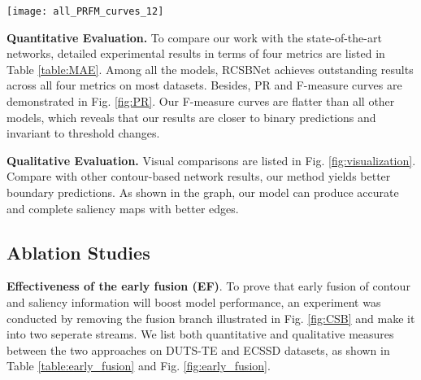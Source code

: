 \documentclass[10pt,twocolumn,letterpaper]{article}
\begin{document}
\begin{figure*}[!h]
\centering
     \texttt{[image: all\_PRFM\_curves\_12]}
     \caption{First row: Precision-Recall Curves comparison on five saliency benchmark datasets. Second row: F-measure Curves comparison on five saliency benchmark datasets. }
     \label{fig:PR}
\end{figure*}

\textbf{Quantitative Evaluation.}
To compare our work with the state-of-the-art networks, detailed experimental results in terms of four metrics are listed in Table \ref{table:MAE}. Among all the models, RCSBNet achieves outstanding results across all four metrics on most datasets. Besides, PR and F-measure curves are demonstrated in Fig. \ref{fig:PR}. Our F-measure curves are flatter than all other models, which reveals that our results are closer to binary predictions and invariant to threshold changes.

\textbf{Qualitative Evaluation.}
Visual comparisons are listed in Fig. \ref{fig:visualization}. Compare with other contour-based network results, our method yields better boundary predictions. As shown in the graph, our model can produce accurate and complete saliency maps with better edges.



\subsection{Ablation Studies}\label{ablation}
\textbf{Effectiveness of the early fusion (EF)}. To prove that early fusion of contour and saliency information will boost model performance, an experiment was conducted by removing the fusion branch illustrated in Fig. \ref{fig:CSB} and make it into two seperate streams. We list both quantitative and qualitative measures between the two approaches on DUTS-TE and ECSSD datasets, as shown in Table \ref{table:early_fusion} and Fig. \ref{fig:early_fusion}.
\end{document}
